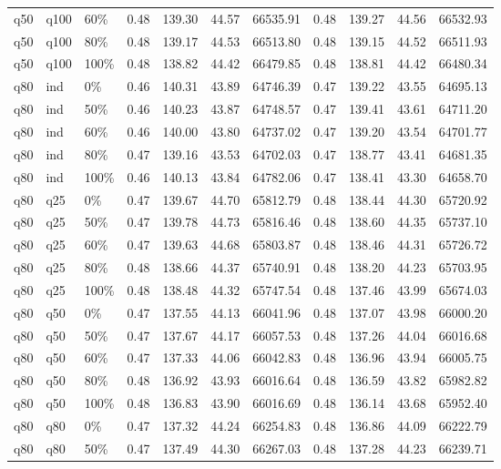 \begin{longtable}{lllrrrrrrrr}
  q50 & q100 & 60\% & 0.48 & 139.30 & 44.57 & 66535.91 & 0.48 & 139.27 & 44.56 & 66532.93 \\ 
  q50 & q100 & 80\% & 0.48 & 139.17 & 44.53 & 66513.80 & 0.48 & 139.15 & 44.52 & 66511.93 \\ 
  q50 & q100 & 100\% & 0.48 & 138.82 & 44.42 & 66479.85 & 0.48 & 138.81 & 44.42 & 66480.34 \\ 
  q80 & ind & 0\% & 0.46 & 140.31 & 43.89 & 64746.39 & 0.47 & 139.22 & 43.55 & 64695.13 \\ 
  q80 & ind & 50\% & 0.46 & 140.23 & 43.87 & 64748.57 & 0.47 & 139.41 & 43.61 & 64711.20 \\ 
  q80 & ind & 60\% & 0.46 & 140.00 & 43.80 & 64737.02 & 0.47 & 139.20 & 43.54 & 64701.77 \\ 
  q80 & ind & 80\% & 0.47 & 139.16 & 43.53 & 64702.03 & 0.47 & 138.77 & 43.41 & 64681.35 \\ 
  q80 & ind & 100\% & 0.46 & 140.13 & 43.84 & 64782.06 & 0.47 & 138.41 & 43.30 & 64658.70 \\ 
  q80 & q25 & 0\% & 0.47 & 139.67 & 44.70 & 65812.79 & 0.48 & 138.44 & 44.30 & 65720.92 \\ 
  q80 & q25 & 50\% & 0.47 & 139.78 & 44.73 & 65816.46 & 0.48 & 138.60 & 44.35 & 65737.10 \\ 
  q80 & q25 & 60\% & 0.47 & 139.63 & 44.68 & 65803.87 & 0.48 & 138.46 & 44.31 & 65726.72 \\ 
  q80 & q25 & 80\% & 0.48 & 138.66 & 44.37 & 65740.91 & 0.48 & 138.20 & 44.23 & 65703.95 \\ 
  q80 & q25 & 100\% & 0.48 & 138.48 & 44.32 & 65747.54 & 0.48 & 137.46 & 43.99 & 65674.03 \\ 
  q80 & q50 & 0\% & 0.47 & 137.55 & 44.13 & 66041.96 & 0.48 & 137.07 & 43.98 & 66000.20 \\ 
  q80 & q50 & 50\% & 0.47 & 137.67 & 44.17 & 66057.53 & 0.48 & 137.26 & 44.04 & 66016.68 \\ 
  q80 & q50 & 60\% & 0.47 & 137.33 & 44.06 & 66042.83 & 0.48 & 136.96 & 43.94 & 66005.75 \\ 
  q80 & q50 & 80\% & 0.48 & 136.92 & 43.93 & 66016.64 & 0.48 & 136.59 & 43.82 & 65982.82 \\ 
  q80 & q50 & 100\% & 0.48 & 136.83 & 43.90 & 66016.69 & 0.48 & 136.14 & 43.68 & 65952.40 \\ 
  q80 & q80 & 0\% & 0.47 & 137.32 & 44.24 & 66254.83 & 0.48 & 136.86 & 44.09 & 66222.79 \\ 
  q80 & q80 & 50\% & 0.47 & 137.49 & 44.30 & 66267.03 & 0.48 & 137.28 & 44.23 & 66239.71 \\ 

\end{longtable}
